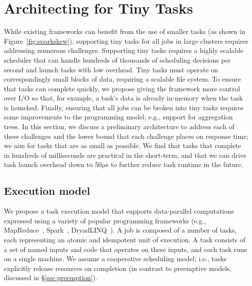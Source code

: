 \section{Architecting for Tiny Tasks}
\label{sec:architecture}

While existing frameworks can benefit from the use of smaller tasks (as shown
in Figure~\ref{fig:sparkskew}), supporting tiny tasks for all jobs in large clusters
requires addressing numerous challenges.
Supporting tiny tasks requires a highly scalable scheduler that can
handle hundreds of thousands of scheduling decisions per second and
launch tasks with low overhead. Tiny tasks must operate on correspondingly
small blocks of data, requiring a scalable file system. To ensure that
tasks can complete quickly, we propose giving the framework more control
over I/O so that, for example, a task's data is already in-memory when the
task is launched.
Finally, ensuring
that all jobs can be broken into tiny tasks requires some improvements
to the programming model; e.g., support for aggregation trees.
In this section, we discuss a preliminary architecture to address
each of these challenges and the lower bound that each challenge places
on response time; we aim for tasks that are as small as possible.
We find that tasks that complete in hundreds of milliseconds
are practical in the short-term, and that we can drive task launch overhead
down to 50$\mu$s to further reduce task runtime in the future.

\subsection{Execution model}
We propose a task execution model that supports data-parallel computations
expressed using a variety of popular programming frameworks (e.g.,
MapReduce~\cite{dean2008mapreduce}, Spark~\cite{zaharia2010spark},
DryadLINQ~\cite{yu2008dryadlinq}).
A job is composed of a number of tasks, each representing an atomic
and idempotent unit of execution. A task consists of a set of named inputs
and code that operates on these inputs, and each task runs on a single machine.
We assume a cooperative scheduling model; i.e., tasks explicitly release
resources on completion (in contrast to preemptive models, discussed in
\S\ref{sec:preemption}).



